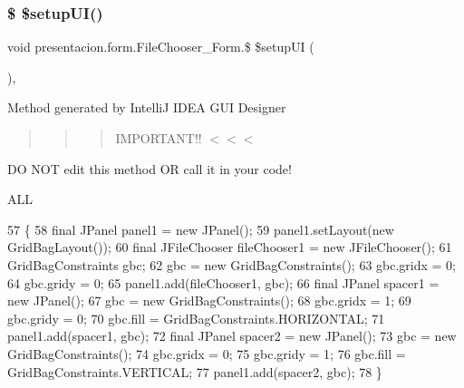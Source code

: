 \subsubsection{\texorpdfstring{\$ \$setup\+U\+I()}{$ $setupUI()}}
{\footnotesize\ttfamily void presentacion.\+form.\+File\+Chooser\+\_\+\+Form.\$ \$setup\+UI (\begin{DoxyParamCaption}{ }\end{DoxyParamCaption})\hspace{0.3cm}{\ttfamily [inline]}, {\ttfamily [private]}}

Method generated by IntelliJ I\+D\+EA G\+UI Designer \begin{quote}
\begin{quote}
\begin{quote}
I\+M\+P\+O\+R\+T\+A\+N\+T!! $<$$<$$<$ \end{quote}
\end{quote}
\end{quote}
DO N\+OT edit this method OR call it in your code!

A\+LL 
\begin{DoxyCode}
57                                  \{
58         \textcolor{keyword}{final} JPanel panel1 = \textcolor{keyword}{new} JPanel();
59         panel1.setLayout(\textcolor{keyword}{new} GridBagLayout());
60         \textcolor{keyword}{final} JFileChooser fileChooser1 = \textcolor{keyword}{new} JFileChooser();
61         GridBagConstraints gbc;
62         gbc = \textcolor{keyword}{new} GridBagConstraints();
63         gbc.gridx = 0;
64         gbc.gridy = 0;
65         panel1.add(fileChooser1, gbc);
66         \textcolor{keyword}{final} JPanel spacer1 = \textcolor{keyword}{new} JPanel();
67         gbc = \textcolor{keyword}{new} GridBagConstraints();
68         gbc.gridx = 1;
69         gbc.gridy = 0;
70         gbc.fill = GridBagConstraints.HORIZONTAL;
71         panel1.add(spacer1, gbc);
72         \textcolor{keyword}{final} JPanel spacer2 = \textcolor{keyword}{new} JPanel();
73         gbc = \textcolor{keyword}{new} GridBagConstraints();
74         gbc.gridx = 0;
75         gbc.gridy = 1;
76         gbc.fill = GridBagConstraints.VERTICAL;
77         panel1.add(spacer2, gbc);
78     \}
\end{DoxyCode}
\mbox{\label{classpresentacion_1_1form_1_1FileChooser__Form_a8d945fc06608ce6b2d4e49318b9c7b41}} 
